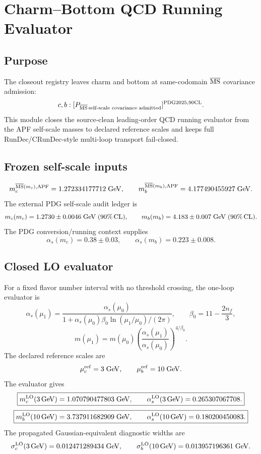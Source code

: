 
\section{Charm--Bottom QCD Running Evaluator}
\label{sec:v71-charm-bottom-qcd-running}

\subsection{Purpose}
The closeout registry leaves charm and bottom at same-codomain \(\overline{\rm MS}\) covariance admission:
\[
 c,b:[P_{\overline{\rm MS}\,\text{self-scale covariance admitted}}]^{\rm PDG2025,90CL}.
\]
This module closes the source-clean leading-order QCD running evaluator from the APF self-scale masses to declared reference scales and keeps full RunDec/CRunDec-style multi-loop transport fail-closed.

\subsection{Frozen self-scale inputs}
\[
 m_c^{\overline{\rm MS}(m_c),\rm APF}=1.272334177712\;{\rm GeV},\qquad
 m_b^{\overline{\rm MS}(m_b),\rm APF}=4.177490455927\;{\rm GeV}.
\]
The external PDG self-scale audit ledger is
\[
 m_c(m_c)=1.2730\pm0.0046\;{\rm GeV}\;(90\%\,{\rm CL}),\qquad
 m_b(m_b)=4.183\pm0.007\;{\rm GeV}\;(90\%\,{\rm CL}).
\]
The PDG conversion/running context supplies
\[
 \alpha_s(m_c)=0.38\pm0.03,
 \qquad
 \alpha_s(m_b)=0.223\pm0.008.
\]

\subsection{Closed LO evaluator}
For a fixed flavor number interval with no threshold crossing, the one-loop evaluator is
\[
 \alpha_s(\mu_1)=\frac{\alpha_s(\mu_0)}{1+\alpha_s(\mu_0)\beta_0\ln(\mu_1/\mu_0)/(2\pi)},
 \qquad
 \beta_0=11-\frac{2n_f}{3},
\]
\[
 m(\mu_1)=m(\mu_0)\left(\frac{\alpha_s(\mu_1)}{\alpha_s(\mu_0)}\right)^{4/\beta_0}.
\]
The declared reference scales are
\[
 \mu_c^{\rm ref}=3\;{\rm GeV},\qquad \mu_b^{\rm ref}=10\;{\rm GeV}.
\]
The evaluator gives
\[
 \boxed{m_c^{\rm LO}(3\,{\rm GeV})=1.070790477803\;{\rm GeV},\qquad \alpha_s^{\rm LO}(3\,{\rm GeV})=0.265307067708.}
\]
\[
 \boxed{m_b^{\rm LO}(10\,{\rm GeV})=3.737911682909\;{\rm GeV},\qquad \alpha_s^{\rm LO}(10\,{\rm GeV})=0.180200450083.}
\]
The propagated Gaussian-equivalent diagnostic widths are
\[
 \sigma_c^{\rm LO}(3\,{\rm GeV})=0.012471289434\;{\rm GeV},\qquad
 \sigma_b^{\rm LO}(10\,{\rm GeV})=0.013957196361\;{\rm GeV}.
\]

